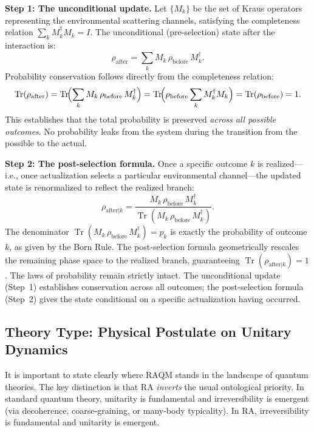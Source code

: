 \documentclass[11pt,a4paper]{article}
\theoremstyle{plain}
\theoremstyle{definition}
\theoremstyle{remark}
\begin{document}
\textbf{Step 1: The unconditional update.} Let $\{M_k\}$ be the set of Kraus
operators representing the environmental scattering channels, satisfying the
completeness relation $\sum_k M_k^{\dagger}M_k = I$. The unconditional
(pre-selection) state after the interaction is:
\begin{equation}
  \rho_{\mathrm{after}} = \sum_k M_k\,\rho_{\mathrm{before}}\,M_k^{\dagger}.
\end{equation}
Probability conservation follows directly from the completeness relation:
\begin{equation}
  \operatorname{Tr}(\rho_{\mathrm{after}})
  = \operatorname{Tr}\!\Bigl(\sum_k M_k\,\rho_{\mathrm{before}}\,M_k^{\dagger}\Bigr)
  = \operatorname{Tr}\!\Bigl(\rho_{\mathrm{before}}\sum_k M_k^{\dagger}M_k\Bigr)
  = \operatorname{Tr}(\rho_{\mathrm{before}})
  = 1.
\end{equation}
This establishes that the total probability is preserved \emph{across all possible
outcomes}. No probability leaks from the system during the transition from the
possible to the actual.

\textbf{Step 2: The post-selection formula.} Once a specific outcome $k$ is
realized---i.e., once actualization selects a particular environmental
channel---the updated state is renormalized to reflect the realized branch:
\begin{equation}
  \rho_{\mathrm{after}|k}
  = \frac{M_k\,\rho_{\mathrm{before}}\,M_k^{\dagger}}
         {\operatorname{Tr}(M_k\,\rho_{\mathrm{before}}\,M_k^{\dagger})}.
\end{equation}
The denominator $\operatorname{Tr}(M_k\,\rho_{\mathrm{before}}\,M_k^{\dagger}) =
p_k$ is exactly the probability of outcome $k$, as given by the Born Rule. The
post-selection formula geometrically rescales the remaining phase space to the
realized branch, guaranteeing $\operatorname{Tr}(\rho_{\mathrm{after}|k}) = 1$.
The laws of probability remain strictly intact. The unconditional update (Step~1)
establishes conservation across all outcomes; the post-selection formula (Step~2)
gives the state conditional on a specific actualization having occurred.


\subsection{Theory Type: Physical Postulate on Unitary Dynamics}
\label{sec:theory_type}

It is important to state clearly where RAQM stands in the landscape of
quantum theories. The key distinction is that RA \emph{inverts} the usual
ontological priority. In standard quantum theory, unitarity is fundamental
and irreversibility is emergent (via decoherence, coarse-graining, or
many-body typicality). In RA, irreversibility is fundamental and unitarity
is emergent.
\end{document}
